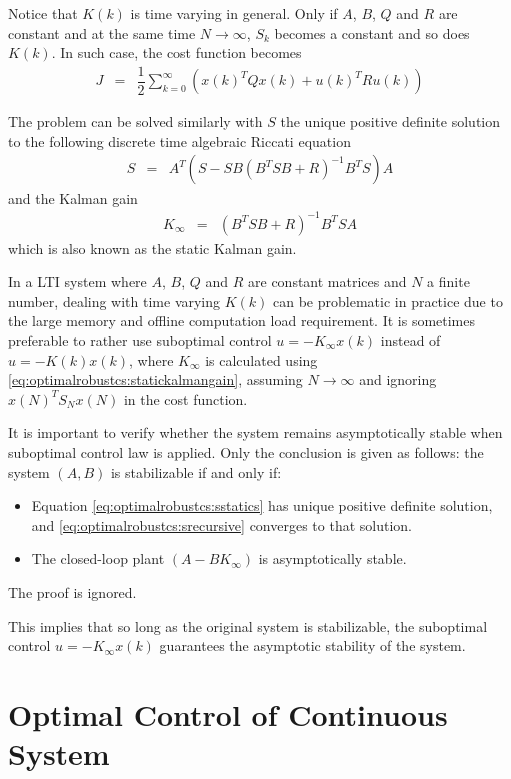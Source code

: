 Notice that $K(k)$ is time varying in general. Only if $A$, $B$, $Q$ and $R$ are constant and at the same time $N\rightarrow\infty$, $S_k$ becomes a constant and so does $K(k)$. In such case, the cost function becomes
\begin{eqnarray}
	J &=& \dfrac{1}{2}\sum_{k=0}^{\infty}\left(x(k)^TQx(k) + u(k)^TRu(k)\right) \nonumber
\end{eqnarray}

The problem can be solved similarly with $S$ the unique positive definite solution to the following discrete time algebraic Riccati equation
\begin{eqnarray}
	S &=&  A^T\left(S-SB\left(B^TSB + R\right)^{-1}B^TS\right)A \label{eq:optimalrobustcs:sstatics}
\end{eqnarray}
and the Kalman gain
\begin{eqnarray}
	K_\infty &=& \left(B^TSB + R\right)^{-1}B^TSA \label{eq:optimalrobustcs:statickalmangain}
\end{eqnarray}
which is also known as the static Kalman gain.

In a LTI system where $A$, $B$, $Q$ and $R$ are constant matrices and $N$ a finite number, dealing with time varying $K(k)$ can be problematic in practice due to the large memory and offline computation load requirement. It is sometimes preferable to rather use suboptimal control $u=-K_\infty x(k)$ instead of $u=-K(k)x(k)$, where $K_\infty$ is calculated using \eqref{eq:optimalrobustcs:statickalmangain}, assuming $N\rightarrow\infty$ and ignoring $x(N)^TS_Nx(N)$ in the cost function.

It is important to verify whether the system remains asymptotically stable when suboptimal control law is applied. Only the conclusion is given as follows: the system $(A,B)$ is stabilizable if and only if:
\begin{itemize}
	\item Equation \eqref{eq:optimalrobustcs:sstatics} has unique positive definite solution, and \eqref{eq:optimalrobustcs:srecursive} converges to that solution.
	\item The closed-loop plant $(A-BK_\infty)$ is asymptotically stable.
\end{itemize}
The proof is ignored.

This implies that so long as the original system is stabilizable, the suboptimal control $u=-K_\infty x(k)$ guarantees the asymptotic stability of the system.

\section{Optimal Control of Continuous System}

